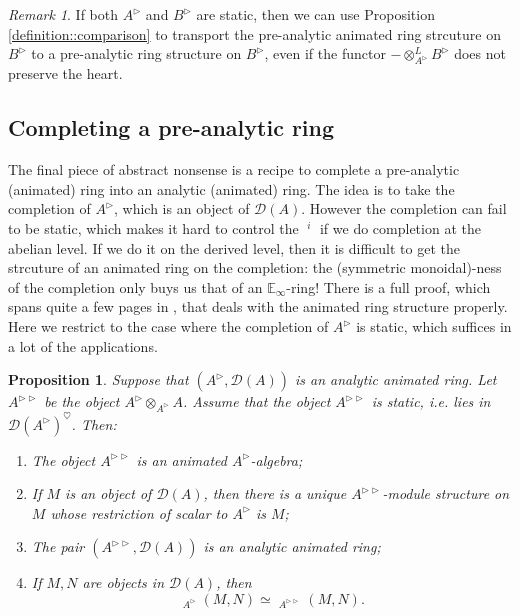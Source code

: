 \documentclass{article}
\theoremstyle{plain}
\newtheorem{prop}[thm]{Proposition}
\theoremstyle{definition}
\theoremstyle{remark}
\newtheorem{rmk}[thm]{Remark}
\DeclareMathOperator{\rhoms}{\underline{RHom}}
\DeclareMathOperator{\exts}{\underline{Ext}}
\newcommand{\dten}{\otimes ^{L}}
\newcommand{\huflag}{\triangleright}
\newcommand{\D}{\mathcal{D}}
\newcommand{\heart}{\heartsuit}
\begin{document}
\begin{rmk}
If both $ A ^{\huflag} $ and $ B ^{\huflag} $ are static, then we can use Proposition \ref{definition::comparison} to transport the
pre-analytic animated ring strcuture on $ B ^{\huflag} $ to a pre-analytic ring structure on $ B ^{\huflag} $,
even if the functor $ -\dten _{A ^{\huflag}}B ^{\huflag} $ does not preserve the heart.
\end{rmk}

\subsection{Completing a pre-analytic ring}

The final piece of abstract nonsense is a recipe to complete a pre-analytic (animated) ring into an analytic (animated) ring.
The idea is to take the completion of $ A ^{\huflag} $, which is an object of $ \D (A) $.
However the completion can fail to be static, which makes it hard to control the $ \exts ^{i} $ if we do completion at the abelian level.
If we do it on the derived level, then it is difficult to get the strcuture of an animated ring on the completion:
the (symmetric monoidal)-ness of the completion only buys us that of an $ \mathbb{E}_{\infty} $-ring!
There is a full proof, which spans quite a few pages in \cite{rodriguez-camargo_notes_nodate},
that deals with the animated ring structure properly.
Here we restrict to the case where the completion of $ A ^{\huflag} $ is static,
which suffices in a lot of the applications.
\begin{prop}
Suppose that $ (A ^{\huflag}, \D (A)) $ is an analytic animated ring.
Let $ A ^{\huflag\huflag} $ be the object $ A ^{\huflag} \otimes _{A ^{\huflag}} A $.
Assume that the object $ A ^{\huflag\huflag} $ is static, i.e. lies in $ \D (A ^{\huflag})^{\heart} $.
Then:
\begin{enumerate}
\item The object $ A ^{\huflag\huflag} $ is an animated $ A ^{\huflag} $-algebra;
\item If $ M $ is an object of $ \D (A) $, then there is a unique $ A ^{\huflag\huflag} $-module structure on $ M $
whose restriction of scalar to $ A ^{\huflag} $ is $ M $;
\item The pair $ (A ^{\huflag\huflag}, \D (A)) $ is an analytic animated ring;
\item If $ M,N $ are objects in $ \D (A) $, then
\begin{equation*}
\rhoms _{A ^{\huflag}}(M, N) \simeq \rhoms _{A ^{\huflag\huflag}}(M, N).
\end{equation*}
\end{enumerate}
\end{prop}
\end{document}
